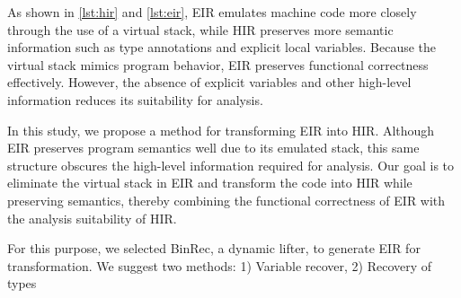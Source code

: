 As shown in \autoref{lst:hir} and \autoref{lst:eir}, EIR emulates machine code
more closely through the use of a virtual stack, while HIR preserves more
semantic information such as type annotations and explicit local variables.
Because the virtual stack mimics program behavior, EIR preserves functional
correctness effectively. However, the absence of explicit variables and other
high-level information reduces its suitability for analysis.

In this study, we propose a method for transforming EIR into HIR. Although EIR
preserves program semantics well due to its emulated stack, this same structure
obscures the high-level information required for analysis. Our goal is to
eliminate the virtual stack in EIR and transform the code into HIR while
preserving semantics, thereby combining the functional correctness of EIR with
the analysis suitability of HIR.

For this purpose, we selected BinRec\cite{euro-binrec}, a dynamic lifter, to
generate EIR for transformation. We suggest two methods: 1) Variable recover,
2) Recovery of types

